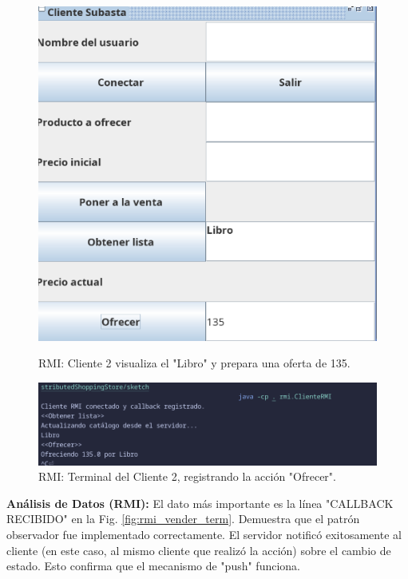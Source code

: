 \documentclass[11pt, a4paper]{article}
\begin{document}
\begin{figure}[h!]
    \centering
    \begin{minipage}{0.48\textwidth}
        \centering
        \includegraphics[width=\linewidth]{media/rmi-screenshots/Offer-Client2.png}
        \caption{RMI: Cliente 2 visualiza el "Libro" y prepara una oferta de 135.}
        \label{fig:rmi_oferta_gui}
    \end{minipage}\hfill
    \begin{minipage}{0.48\textwidth}
        \centering
        \includegraphics[width=\linewidth]{media/rmi-screenshots/Offer-Terminal-Client2.png}
        \caption{RMI: Terminal del Cliente 2, registrando la acción "Ofrecer".}
        \label{fig:rmi_oferta_term}
    \end{minipage}
\end{figure}

\textbf{Análisis de Datos (RMI):} El dato más importante es la línea "CALLBACK RECIBIDO" en la Fig. \ref{fig:rmi_vender_term}. Demuestra que el patrón observador fue implementado correctamente. El servidor notificó exitosamente al cliente (en este caso, al mismo cliente que realizó la acción) sobre el cambio de estado. Esto confirma que el mecanismo de "push" funciona.
\end{document}
